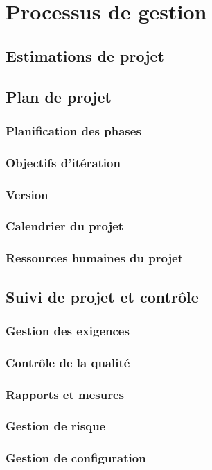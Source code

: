 \section{Processus de gestion}
\subsection{Estimations de projet}

\subsection{Plan de projet}
\subsubsection{Planification des phases}
\subsubsection{Objectifs d’itération}
\subsubsection{Version}
\subsubsection{Calendrier du projet}
\subsubsection{Ressources humaines du projet}

\subsection{Suivi de projet et contrôle}
\subsubsection{Gestion des exigences}
\subsubsection{Contrôle de la qualité}
\subsubsection{Rapports et mesures}
\subsubsection{Gestion de risque}
\subsubsection{Gestion de configuration}
